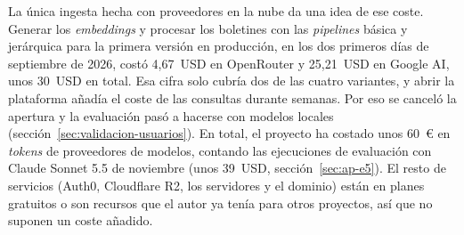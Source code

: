 La única ingesta hecha con proveedores en la nube da una idea de ese coste. Generar los \emph{embeddings} y procesar los boletines con las \emph{pipelines} básica y jerárquica para la primera versión en producción, en los dos primeros días de septiembre de 2026, costó 4,67~USD en OpenRouter y 25,21~USD en Google AI, unos 30~USD en total. Esa cifra solo cubría dos de las cuatro variantes, y abrir la plataforma añadía el coste de las consultas durante semanas. Por eso se canceló la apertura y la evaluación pasó a hacerse con modelos locales (sección~\ref{sec:validacion-usuarios}).
En total, el proyecto ha costado unos 60~€ en \emph{tokens} de proveedores de modelos, contando las ejecuciones de evaluación con Claude Sonnet 5.5 de noviembre (unos 39~USD, sección~\ref{sec:ap-e5}). El resto de servicios (Auth0, Cloudflare R2, los servidores y el dominio) están en planes gratuitos o son recursos que el autor ya tenía para otros proyectos, así que no suponen un coste añadido.
